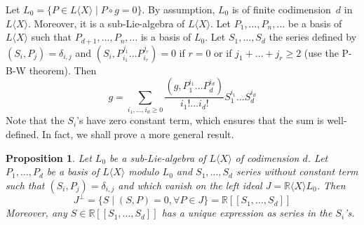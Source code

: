 \documentclass[a4paper,12pt]{article}
\newtheorem{proposition}{Proposition}
\newcommand{\R}{\mathbb{R}}
\newcommand{\Rx}{\R\langle X\rangle}
\newcommand{\Lx}{L\langle X\rangle}
\begin{document}
Let ${L}_0=\{{P} \in \Lx \mid {P} \circ {g}=0\}$. By assumption, ${L}_0$ is of finite codimension~$d$ in $\Lx$. Moreover, it is a sub-Lie-algebra of $\Lx$.
Let $P_1, \ldots, P_n, \ldots$ be a basis of $\Lx$ such that $P_{d+1}, \ldots, P_n, \ldots$ is a basis of $L_0$. 
Let $S_1, \ldots, S_d$ the series defined by $\left(S_i, P_j\right)=\delta_{i, j}$ and $\left(S_i, P_{i_1}^{j_1} \ldots P_{i_r}^{j_r}\right)=0$ if $r=0$ or if $j_1+\ldots+j_r \geq 2$ (use the P-B-W theorem). Then
\begin{equation} \label{eq:3.1} \tag{1}
	g=\sum_{i_1, \ldots, i_d \geq 0} \frac{\left(g, P_1^{i_1} \ldots P_d^{i_d}\right)}{i_{1} ! \ldots i_{d} !} S_1^{i_1} \ldots S_d^{i_d}
\end{equation}
Note that the $S_i$'s have zero constant term, which ensures that the sum is well-defined.
In fact, we shall prove a more general result.

\begin{proposition} \label{p:1}
	Let ${L}_0$ be a sub-Lie-algebra of $\Lx$ of codimension ${d}$. Let ${P}_1, \ldots, {P}_{{d}}$ be a basis of $\Lx$ modulo $L_0$ and $S_1, \dotsc, S_d$ series without constant term such that $\left(S_i, P_j\right)=\delta_{i, j}$ and which vanish on the left ideal ${J}=\Rx L_0$. Then
	\begin{equation*}
		J^\perp =\{{S} \mid({S}, {P})=0,  \forall {P} \in {J}\}=\R \left[\left[{S}_1, \ldots, {S}_{{d}}\right]\right]
	\end{equation*}
	Moreover, any $S \in \R\left[\left[S_1, \ldots, S_d\right]\right]$ has a unique expression as series in the $S_i$'s.
\end{proposition}
\end{document}
